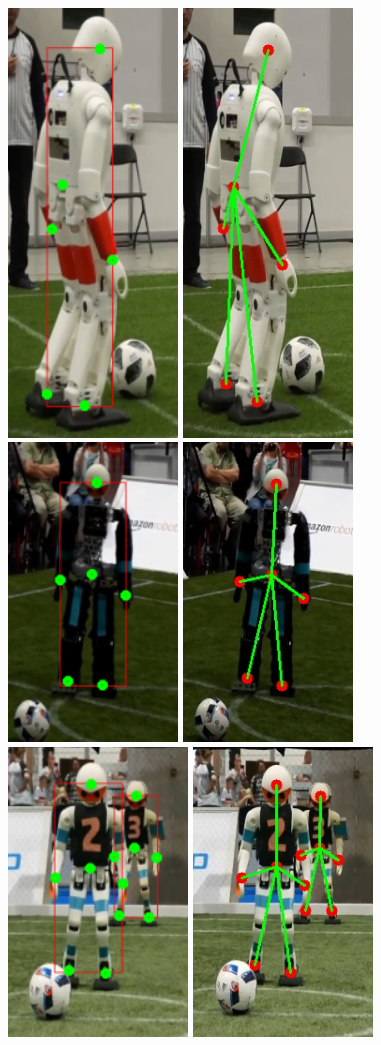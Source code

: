 \begin{figure}
  \\[\medskipamount]
  \includegraphics[width=.11\textwidth]{gambar/comp_with_gt/robot_7_gt.png}
  \includegraphics[width=.11\textwidth]{gambar/comp_with_gt/robot_7_res.png} \hfill%
  \includegraphics[width=.155\textwidth]{gambar/comp_with_gt/robot_8_gt.png}
  \includegraphics[width=.155\textwidth]{gambar/comp_with_gt/robot_8_res.png} \hfill%
  \includegraphics[width=.17\textwidth]{gambar/comp_with_gt/robot_9_gt.png}
  \includegraphics[width=.17\textwidth]{gambar/comp_with_gt/robot_9_res.png}

\end{figure}
